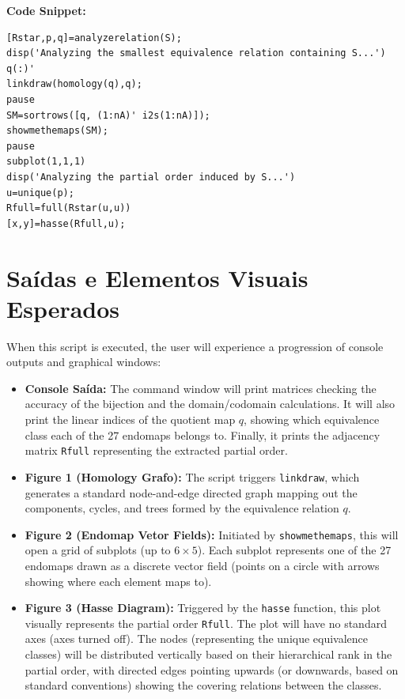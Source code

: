 \textbf{Code Snippet:}
\begin{lstlisting}
[Rstar,p,q]=analyzerelation(S);
disp('Analyzing the smallest equivalence relation containing S...')
q(:)'
linkdraw(homology(q),q);
pause
SM=sortrows([q, (1:nA)' i2s(1:nA)]);
showmethemaps(SM);
pause
subplot(1,1,1)
disp('Analyzing the partial order induced by S...')
u=unique(p);
Rfull=full(Rstar(u,u))
[x,y]=hasse(Rfull,u);
\end{lstlisting}

\newpage
\section{Saídas e Elementos Visuais Esperados}

When this script is executed, the user will experience a progression of console outputs and graphical windows:

\begin{itemize}
    \item \textbf{Console Saída:} The command window will print matrices checking the accuracy of the bijection and the domain/codomain calculations. It will also print the linear indices of the quotient map $q$, showing which equivalence class each of the 27 endomaps belongs to. Finally, it prints the adjacency matrix \texttt{Rfull} representing the extracted partial order.
    
    \item \textbf{Figure 1 (Homology Grafo):} The script triggers \texttt{linkdraw}, which generates a standard node-and-edge directed graph mapping out the components, cycles, and trees formed by the equivalence relation $q$. 
    
    \item \textbf{Figure 2 (Endomap Vetor Fields):} Initiated by \texttt{showmethemaps}, this will open a grid of subplots (up to $6 \times 5$). Each subplot represents one of the 27 endomaps drawn as a discrete vector field (points on a circle with arrows showing where each element maps to).
    
    \item \textbf{Figure 3 (Hasse Diagram):} Triggered by the \texttt{hasse} function, this plot visually represents the partial order \texttt{Rfull}. The plot will have no standard axes (axes turned off). The nodes (representing the unique equivalence classes) will be distributed vertically based on their hierarchical rank in the partial order, with directed edges pointing upwards (or downwards, based on standard conventions) showing the covering relations between the classes.
\end{itemize}

